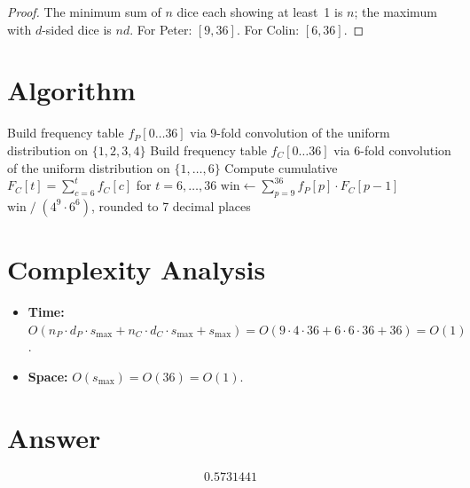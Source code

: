 \documentclass[12pt]{article}
\begin{document}
\begin{proof}
The minimum sum of $n$ dice each showing at least~1 is $n$; the maximum with $d$-sided
dice is $nd$. For Peter: $[9, 36]$. For Colin: $[6, 36]$.
\end{proof}

\section{Algorithm}

\begin{algorithmic}[1]
\State Build frequency table $f_P[0\ldots 36]$ via 9-fold convolution of the uniform distribution on $\{1,2,3,4\}$
\State Build frequency table $f_C[0\ldots 36]$ via 6-fold convolution of the uniform distribution on $\{1,\ldots,6\}$
\State Compute cumulative $F_C[t] = \sum_{c=6}^{t} f_C[c]$ for $t = 6, \ldots, 36$
\State $\mathrm{win} \gets \sum_{p=9}^{36} f_P[p] \cdot F_C[p-1]$
\State \Return $\mathrm{win} \;/\; (4^9 \cdot 6^6)$, rounded to 7 decimal places
\end{algorithmic}

\section{Complexity Analysis}
\begin{itemize}
    \item \textbf{Time:} $O(n_P \cdot d_P \cdot s_{\max} + n_C \cdot d_C \cdot s_{\max} + s_{\max})
          = O(9 \cdot 4 \cdot 36 + 6 \cdot 6 \cdot 36 + 36) = O(1)$.
    \item \textbf{Space:} $O(s_{\max}) = O(36) = O(1)$.
\end{itemize}

\section{Answer}

\[
\boxed{0.5731441}
\]
\end{document}
